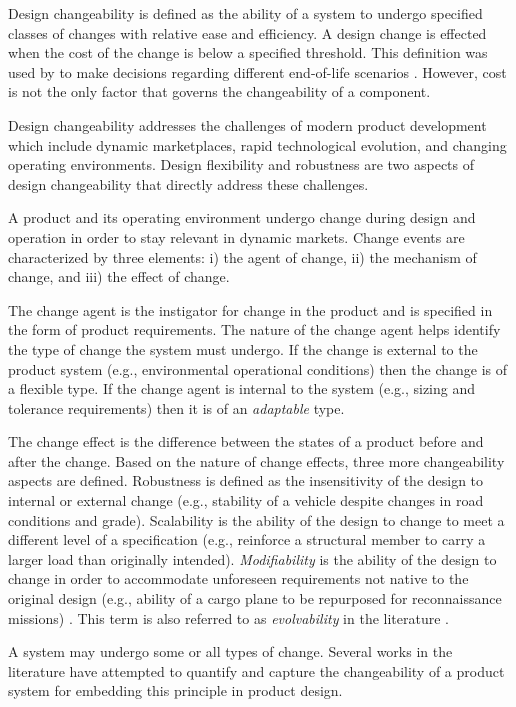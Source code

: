 Design changeability is defined as the ability of a system to undergo specified classes of changes with relative ease and efficiency. A design change is effected when the cost of the change is below a specified threshold. This definition was used by \citeauthor{Lawand2019} to make decisions regarding different end-of-life scenarios  \cite{Lawand2019}. However, cost is not the only factor that governs the changeability of a component.

Design changeability addresses the challenges of modern product development which include dynamic marketplaces, rapid technological evolution, and changing operating environments. Design flexibility and robustness are two aspects of design changeability that directly address these challenges.

A product and its operating environment undergo change during design and operation in order to stay relevant in dynamic markets. Change events are characterized by three elements: i) the agent of change, ii) the mechanism of change, and iii) the effect of change. 

The change agent is the instigator for change in the product and is specified in the form of product requirements. The nature of the change agent helps identify the type of change the system must undergo. If the change is external to the product system (e.g., environmental operational conditions) then the change is of a {flexible} type. If the change agent is internal to the system (e.g., sizing and tolerance requirements) then it is of an \textit{adaptable} type. 

The change effect is the difference between the states of a product before and after the change. Based on the nature of change effects, three more changeability aspects are defined. {Robustness} is defined as the insensitivity of the design to internal or external change (e.g., stability of a vehicle despite changes in road conditions and grade). {Scalability} is the ability of the design to change to meet a different level of a specification (e.g., reinforce a structural member to carry a larger load than originally intended). \textit{Modifiability} is the ability of the design to change in order to accommodate unforeseen requirements not native to the original design (e.g., ability of a cargo plane to be repurposed for reconnaissance missions) \cite{Ross2008}. This term is also referred to as \textit{evolvability} in the literature \cite{Tackett2014}. 

A system may undergo some or all types of change. Several works in the literature have attempted to quantify and capture the changeability of a product system for embedding this principle in product design. 

